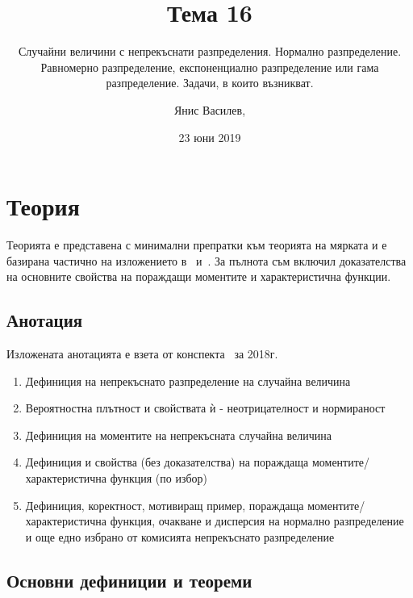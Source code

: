 \documentclass[numbers=endperiod, DIV=15, bibliography=totocnumbered]{scrartcl}
\title{Тема 16}
\subtitle{Случайни величини с непрекъснати разпределения. Нормално разпределение. Равномерно разпределение, експоненциално разпределение или гама разпределение. Задачи, в които възникват.}
\author{Янис Василев, \Email{ianis@ivasilev.net}}
\date{23 юни 2019}
\begin{document}
\maketitle

\section{Теория}

Теорията е представена с минимални препратки към теорията на мярката и е базирана частично на изложението в~\cite{Borovkov} и~\cite{DimitrovYanev}. За пълнота съм включил доказателства на основните свойства на пораждащи моментите и характеристична функции.

\subsection{Анотация}

Изложената анотацията е взета от конспекта~\cite{Syllabus} за 2018г.

\begin{enumerate}
  \item Дефиниция на непрекъснато разпределение на случайна величина
  \item Вероятностна плътност и свойствата ѝ - неотрицателност и нормираност
  \item Дефиниция на моментите на непрекъсната случайна величина
  \item Дефиниция и свойства (без доказателства) на пораждаща моментите/характеристична функция (по избор)
  \item Дефиниция, коректност, мотивиращ пример, пораждаща моментите/характеристична функция, очакване и дисперсия на нормално разпределение и още едно избрано от комисията непрекъснато разпределение
\end{enumerate}

\subsection{Основни дефиниции и теореми}
\end{document}
